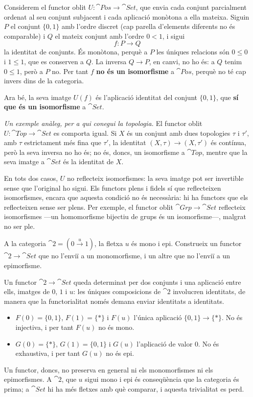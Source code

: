 \begin{solucio}
Considerem el functor oblit $U\colon\cat{Pos}\to\cat{Set}$, que envia cada conjunt parcialment ordenat al seu conjunt subjacent i cada aplicació monòtona a ella mateixa. Siguin $P$ el conjunt $\{0,1\}$ amb l'ordre discret (cap parella d'elements diferents no és comparable) i $Q$ el mateix conjunt amb l'ordre $0<1$, i sigui
\[
f\colon P\to Q
\]
la identitat de conjunts. És monòtona, perquè a $P$ les úniques relacions són $0\le 0$ i $1\le 1$, que es conserven a $Q$. La inversa $Q\to P$, en canvi, no ho és: a $Q$ tenim $0\le 1$, però a $P$ no. Per tant $f$ \textbf{no és un isomorfisme} a $\cat{Pos}$, perquè no té cap invers dins de la categoria.

Ara bé, la seva imatge $U(f)$ és l'aplicació identitat del conjunt $\{0,1\}$, que \textbf{sí que és un isomorfisme} a $\cat{Set}$.

\emph{Un exemple anàleg, per a qui conegui la topologia.} El functor oblit $U\colon\cat{Top}\to\cat{Set}$ es comporta igual. Si $X$ és un conjunt amb dues topologies $\tau$ i $\tau'$, amb $\tau$ estrictament més fina que $\tau'$, la identitat $(X,\tau)\to(X,\tau')$ és contínua, però la seva inversa no ho és; no és, doncs, un isomorfisme a $\cat{Top}$, mentre que la seva imatge a $\cat{Set}$ és la identitat de $X$.

En tots dos casos, $U$ no reflecteix isomorfismes: la seva imatge pot ser invertible sense que l'original ho sigui. Els functors plens i fidels sí que reflecteixen isomorfismes, encara que aquesta condició no és necessària: hi ha functors que els reflecteixen sense ser plens. Per exemple, el functor oblit $\cat{Grp}\to\cat{Set}$ reflecteix isomorfismes ---un homomorfisme bijectiu de grups és un isomorfisme---, malgrat no ser ple.
\end{solucio}

\begin{exercici}\label{pr-2-set-mono-epi}
A la categoria $\cat{2}=(0\xrightarrow{u}1)$, la fletxa $u$ és mono i epi. Construeix un functor $\cat{2}\to\cat{Set}$ que no l'enviï a un monomorfisme, i un altre que no l'enviï a un epimorfisme.
\end{exercici}

\begin{solucio}
Un functor $\cat{2}\to\cat{Set}$ queda determinat per dos conjunts i una aplicació entre ells, imatges de $0$, $1$ i $u$: les úniques composicions de $\cat{2}$ involucren identitats, de manera que la functorialitat només demana enviar identitats a identitats.
\begin{itemize}
  \item $F(0)=\{0,1\}$, $F(1)=\{\ast\}$ i $F(u)$ l'única aplicació $\{0,1\}\to\{\ast\}$. No és injectiva, i per tant $F(u)$ no és mono.
  \item $G(0)=\{\ast\}$, $G(1)=\{0,1\}$ i $G(u)$ l'aplicació de valor $0$. No és exhaustiva, i per tant $G(u)$ no és epi.
\end{itemize}
Un functor, doncs, no preserva en general ni els monomorfismes ni els epimorfismes. A $\cat{2}$, que $u$ sigui mono i epi és conseqüència que la categoria és prima; a $\cat{Set}$ hi ha més fletxes amb què comparar, i aquesta trivialitat es perd.
\end{solucio}

